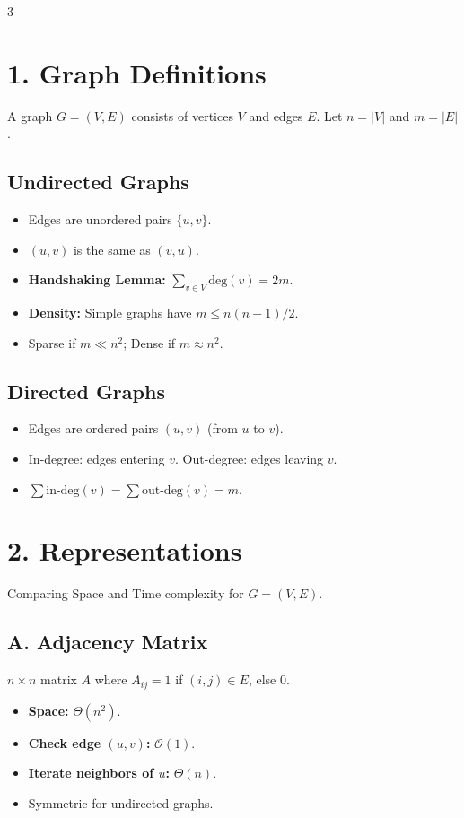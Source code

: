 \documentclass[10pt, a4paper, landscape]{article}
\newcommand{\bigO}{\mathcal{O}}
\begin{document}
\begin{multicols*}{3}

\section{1. Graph Definitions}
A graph $G=(V, E)$ consists of vertices $V$ and edges $E$.
Let $n = |V|$ and $m = |E|$.

\subsection*{Undirected Graphs}
\begin{itemize}
    \item Edges are unordered pairs $\{u, v\}$.
    \item $(u, v)$ is the same as $(v, u)$.
    \item \textbf{Handshaking Lemma:} $\sum_{v \in V} \text{deg}(v) = 2m$.
    \item \textbf{Density:} Simple graphs have $m \le n(n-1)/2$.
    \item Sparse if $m \ll n^2$; Dense if $m \approx n^2$.
\end{itemize}

\subsection*{Directed Graphs}
\begin{itemize}
    \item Edges are ordered pairs $(u, v)$ (from $u$ to $v$).
    \item In-degree: edges entering $v$. Out-degree: edges leaving $v$.
    \item $\sum \text{in-deg}(v) = \sum \text{out-deg}(v) = m$.
\end{itemize}

\section{2. Representations}
Comparing Space and Time complexity for $G=(V, E)$.

\subsection*{A. Adjacency Matrix}
$n \times n$ matrix $A$ where $A_{ij} = 1$ if $(i, j) \in E$, else $0$.
\begin{itemize}
    \item \textbf{Space:} $\Theta(n^2)$.
    \item \textbf{Check edge $(u, v)$:} $\bigO(1)$.
    \item \textbf{Iterate neighbors of $u$:} $\Theta(n)$.
    \item Symmetric for undirected graphs.
\end{itemize}


\end{multicols*}
\end{document}
